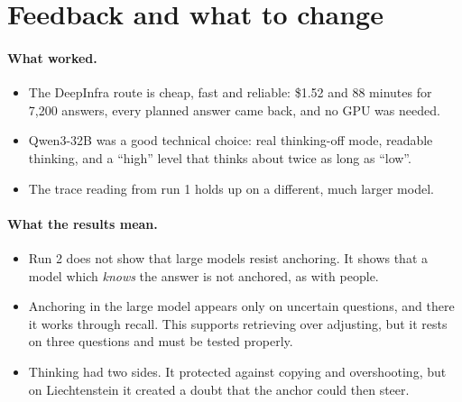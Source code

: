 \documentclass[11pt,a4paper]{article}
\begin{document}
\section{Feedback and what to change}
\label{sec:feedback}

\paragraph{What worked.}
\begin{itemize}
  \item The DeepInfra route is cheap, fast and reliable: \$1.52 and 88 minutes for 7,200 answers, every planned answer came back, and no GPU was needed.
  \item Qwen3-32B was a good technical choice: real thinking-off mode, readable thinking, and a \enquote{high} level that thinks about twice as long as \enquote{low}.
  \item The trace reading from run 1 holds up on a different, much larger model.
\end{itemize}

\paragraph{What the results mean.}
\begin{itemize}
  \item Run 2 does not show that large models resist anchoring. It shows that a model which \emph{knows} the answer is not anchored, as with people.
  \item Anchoring in the large model appears only on uncertain questions, and there it works through recall. This supports retrieving over adjusting, but it rests on three questions and must be tested properly.
  \item Thinking had two sides. It protected against copying and overshooting, but on Liechtenstein it created a doubt that the anchor could then steer.
\end{itemize}
\end{document}
